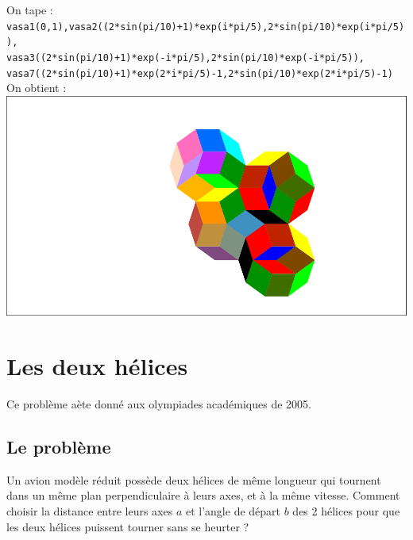 \documentclass[a4paper,11pt]{book}
\begin{document}
On tape :\\
{\tt vasa1(0,1),vasa2((2*sin(pi/10)+1)*exp(i*pi/5),2*sin(pi/10)*exp(i*pi/5)),}\\
{\tt vasa3((2*sin(pi/10)+1)*exp(-i*pi/5),2*sin(pi/10)*exp(-i*pi/5)),}\\
{\tt vasa7((2*sin(pi/10)+1)*exp(2*i*pi/5)-1,2*sin(pi/10)*exp(2*i*pi/5)-1)}\\
On obtient :\\
\includegraphics[width=\textwidth]{vasas}
\section{Les deux h\'elices}
Ce probl\`eme a\`ete donn\'e aux olympiades acad\'emiques de 2005.
\subsection{Le probl\`eme}
Un avion mod\`ele r\'eduit poss\`ede deux h\'elices de m\^eme longueur qui 
tournent dans un m\^eme plan perpendiculaire \`a leurs axes, et \`a la m\^eme 
vitesse. 
Comment choisir la distance entre leurs axes $a$ et l'angle de d\'epart $b$ des
 2 h\'elices pour que les deux h\'elices puissent tourner sans se heurter ?
\end{document}
